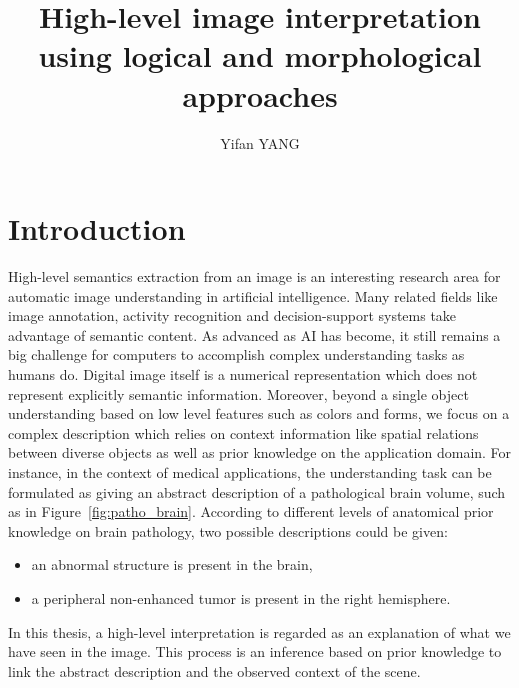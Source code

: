 \documentclass{article}
\title{High-level image interpretation using logical and morphological approaches}
\author{Yifan YANG}
\begin{document}
\maketitle
\section{Introduction}
 High-level semantics extraction from an image is an interesting research area for automatic image understanding in artificial intelligence.
 Many related fields like image annotation, activity recognition and  decision-support systems take advantage of semantic content.
 As advanced as AI has become, it still remains a big challenge for computers to accomplish complex understanding tasks as humans do.
 Digital image itself is a numerical representation which does not represent explicitly semantic information. 
 Moreover, beyond a single object understanding based on low level features such as colors and forms, we focus on a complex description which relies on context information like spatial relations
 between diverse objects as well as prior knowledge on the application domain.
 For instance, in the context of medical applications, the understanding task can be formulated as giving an abstract description of a pathological brain volume, such as in Figure~\ref{fig:patho_brain}. 
  According to different levels of anatomical prior knowledge on brain pathology, two possible descriptions could be given:
 \begin{itemize}
  \item an abnormal structure is present in the brain,
  \item a peripheral non-enhanced tumor is present in the right hemisphere.
 \end{itemize}
 In this thesis, a high-level interpretation is regarded as an explanation of what we have seen in the image.
 This process is an inference based on  prior knowledge to link the abstract description and the observed context of the scene.
\end{document}
